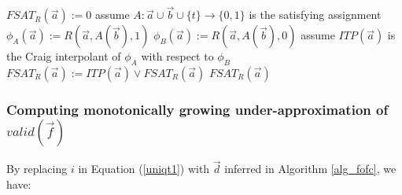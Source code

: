 \documentclass[runningheads,a4paper,orivec]{llncs}
\begin{document}
% 

\begin{algorithm}[t]
\SetAlgoVlined
{}
$FSAT_R(\vec{a}):= 0$ \;
 {
  assume $A:\vec{a}\cup\vec{b}\cup\{t\}\rightarrow \{0,1\}$ is the satisfying assignment \;
  $\phi_A(\vec{a}):= R(\vec{a},A(\vec{b}),1)$ \;
  $\phi_B(\vec{a}):= R(\vec{a},A(\vec{b}),0)$ \;
  assume $ITP(\vec{a})$ is the Craig interpolant of $\phi_A$ with respect to $\phi_B$ \;
  $FSAT_R(\vec{a}):= ITP(\vec{a}) \vee FSAT_R(\vec{a})$ \;
}
\KwRet $FSAT_R(\vec{a})$
\caption{$CharacterizingFormulaSAT(R,\vec{a},\vec{b},t)$
}
\label{alg_craigchar}
\end{algorithm}

\subsubsection{Computing monotonically growing under-approximation of $valid(\vec{f})$}\label{subsub_nonloop}
By replacing $i$ in Equation (\ref{uniqt1}) with $\vec{d}$ inferred in Algorithm \ref{alg_fofc},
we have:
\end{document}
